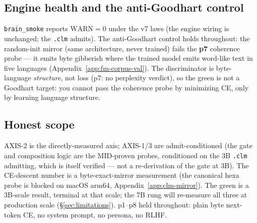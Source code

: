 \subsection{Engine health and the anti-Goodhart control}
\label{app:ta-antigoodhart}

\texttt{brain\_smoke} reports $\text{WARN}=0$ under the v7 laws (the engine wiring
is unchanged; the \texttt{.clm} admits). The anti-Goodhart control holds
throughout: the random-init mirror (same architecture, never trained) fails the
\textbf{p7} coherence probe --- it emits byte gibberish where the trained model
emits word-like text in five languages (Appendix~\ref{app:fm-corpus-val}). The
discriminator is byte-language \emph{structure}, not loss (p7: no perplexity
verdict), so the green is not a Goodhart target: you cannot pass the coherence
probe by minimizing CE, only by learning language structure.

\subsection{Honest scope}
\label{app:ta-scope}

AXIS-2 is the directly-measured axis; AXIS-1/3 are admit-conditioned (the gate and
composition logic are the MID-proven probes, conditioned on the 3B \texttt{.clm}
admitting, which is itself verified --- not a re-derivation of the gate at 3B). The
CE-descent number is a byte-exact-mirror measurement (the canonical hexa probe is
blocked on macOS arm64, Appendix~\ref{app:clm-mirror}). The green is a 3B-scale
result, terminal at that scale; the 7B rung will re-measure all three at production
scale (\S\ref{sec:limitations}). p1--p8 held throughout: plain byte next-token CE,
no system prompt, no persona, no RLHF.

